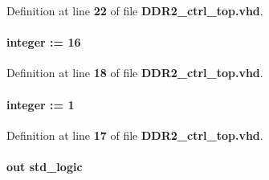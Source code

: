 Definition at line {\bf 22} of file {\bf D\+D\+R2\+\_\+ctrl\+\_\+top.\+vhd}.

\paragraph[{cntrl\+\_\+bus\+\_\+size}]{ {\bfseries \textcolor{vhdlchar}{ }} {\bfseries \textcolor{comment}{integer}\textcolor{vhdlchar}{ }\textcolor{vhdlchar}{ }\textcolor{vhdlchar}{\+:}\textcolor{vhdlchar}{=}\textcolor{vhdlchar}{ }\textcolor{vhdlchar}{ } \textcolor{vhdldigit}{16} \textcolor{vhdlchar}{ }} \hspace{0.3cm}{\ttfamily [Generic]}}\label{classDDR2__ctrl__top_ada516ae720cf16288ea439d5b9844889}


Definition at line {\bf 18} of file {\bf D\+D\+R2\+\_\+ctrl\+\_\+top.\+vhd}.

\paragraph[{cntrl\+\_\+rate}]{ {\bfseries \textcolor{vhdlchar}{ }} {\bfseries \textcolor{comment}{integer}\textcolor{vhdlchar}{ }\textcolor{vhdlchar}{ }\textcolor{vhdlchar}{\+:}\textcolor{vhdlchar}{=}\textcolor{vhdlchar}{ }\textcolor{vhdlchar}{ } \textcolor{vhdldigit}{1} \textcolor{vhdlchar}{ }} \hspace{0.3cm}{\ttfamily [Generic]}}\label{classDDR2__ctrl__top_a8f1808891dd6ea54accadc21aafb4138}


Definition at line {\bf 17} of file {\bf D\+D\+R2\+\_\+ctrl\+\_\+top.\+vhd}.

\paragraph[{fail}]{ {\bfseries \textcolor{keywordflow}{out}\textcolor{vhdlchar}{ }} {\bfseries \textcolor{comment}{std\+\_\+logic}\textcolor{vhdlchar}{ }} \hspace{0.3cm}{\ttfamily [Port]}}\label{classDDR2__ctrl__top_ac8c760cbbf60d6542fd4e3847b4e6bed}


